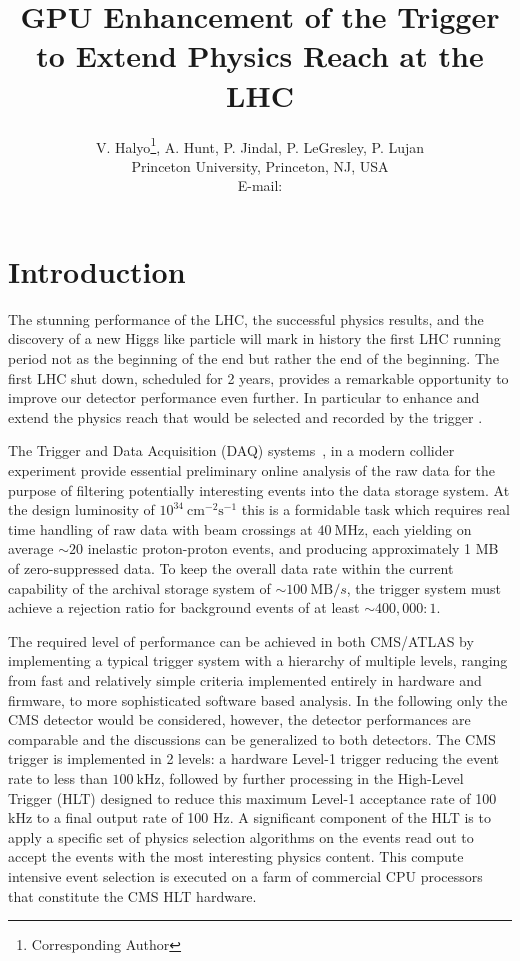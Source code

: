 \documentclass{JINST}
\title{GPU Enhancement of the Trigger to Extend Physics Reach at the LHC}
\author{V. Halyo\thanks{Corresponding Author}, A. Hunt, P. Jindal, P. LeGresley, P. Lujan \\
\llap Princeton University, Princeton, NJ, USA \\
E-mail: \email{vhalyo@gmail.com}}
\begin{document}
% 
% 
\section{Introduction} 
% 

The stunning performance of the LHC, the successful physics results, and the discovery of 
a new Higgs like particle will mark in history the first LHC running period not as the beginning of the end but rather
the end of the beginning. The first LHC shut down, scheduled for 2 years, provides a remarkable opportunity to
 improve our detector performance even further. In particular to enhance and extend the physics reach that would
 be selected and recorded by the trigger .

The Trigger and Data Acquisition (DAQ) systems~\cite{bib:CMSTDR2},\cite{bib:ATLASTDR} \cite{bib:CMSdetpaper} \cite{bib:ATLASdetpaper}
in a modern collider experiment provide essential preliminary online analysis of the raw data for the purpose of
filtering potentially interesting events into the data storage system.
At the design luminosity of $10^{34}~\mathrm{cm}^{-2}\mathrm{s}^{-1}$ this is a formidable task
which requires real time handling of raw data with beam crossings at $40~\mathrm{MHz}$, each yielding
on average ${\sim}20$ inelastic proton-proton events, and producing approximately 1 MB of zero-suppressed data.
To keep the overall data rate within the current capability of the archival storage
system of ${\sim}100~\mathrm{MB}/s$, the trigger system must achieve a rejection ratio for background
events of at least ${\sim}400,000:1$.

The required level of performance can be achieved in both CMS\cite{bib:CMSdetpaper}/ATLAS\cite{bib:ATLASdetpaper}
 by implementing a typical trigger system with a hierarchy of multiple levels, ranging from fast and relatively simple criteria implemented
entirely in hardware and firmware, to more sophisticated software based analysis. 
In the following only the CMS detector would be considered, however, the detector performances
are comparable and the discussions can be generalized to both detectors.
 The CMS trigger is implemented in 2 levels: a hardware Level-1 trigger reducing the event rate
to less than $100~\mathrm{kHz}$, followed by further processing in the High-Level Trigger (HLT)\cite{bib:CMStrigger}
designed to reduce this maximum Level-1 acceptance rate of 100 kHz to a final output rate of 100 Hz.
A significant component of the HLT is to apply a specific set of
physics selection algorithms on the events read out to accept the events with the most interesting physics 
content. This compute intensive event selection is executed on a farm of commercial CPU processors that
constitute the CMS HLT hardware.
\end{document}
